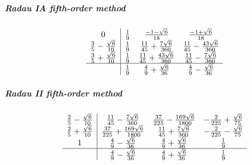 \subparagraph{Radau IA fifth-order method}
\begin{equation}
	\begin{array}{c|ccc}
		0   & \frac{1}{9} & \frac{-1 - \sqrt{6}}{18} & \frac{-1 + \sqrt{6}}{18} \\
		\frac{3}{5} - \frac{\sqrt{6}}{10}  & \frac{1}{9} & \frac{11}{45} + \frac{7\sqrt{6}}{360} & \frac{11}{45} - \frac{43\sqrt{6}}{360}\\
		\frac{3}{5} + \frac{\sqrt{6}}{10} & \frac{1}{9} & \frac{11}{45} + \frac{43\sqrt{6}}{360} & \frac{11}{45} - \frac{7\sqrt{6}}{360}  \\
		\hline
		& \frac{1}{9} & \frac{4}{9} + \frac{\sqrt{6}}{36} & \frac{4}{9} - \frac{\sqrt{6}}{36}  \\
	\end{array}
	\label{eq::radauia}
\end{equation}

\subparagraph{Radau II fifth-order method}
\begin{equation}
	\begin{array}{c|ccc}
		\frac{2}{5} - \frac{\sqrt{6}}{10}   & \frac{11}{45} - \frac{7\sqrt{6}}{360} & \frac{37}{225} - \frac{169\sqrt{6}}{1800} & -\frac{2}{225} + \frac{\sqrt{6}}{75} \\
		\frac{2}{5} + \frac{\sqrt{6}}{10}  & \frac{37}{225} + \frac{169\sqrt{6}}{1800} & \frac{11}{45} + \frac{7\sqrt{6}}{360} & -\frac{2}{225} - \frac{\sqrt{6}}{75}\\
		1                   & \frac{4}{9} - \frac{\sqrt{6}}{36} & \frac{4}{9} + \frac{\sqrt{6}}{36} & \frac{1}{9}  \\
		\hline
		& \frac{4}{9} - \frac{\sqrt{6}}{36} & \frac{4}{9} + \frac{\sqrt{6}}{36} & \frac{1}{9}  \\
	\end{array}
	\label{eq::radauiia}
\end{equation}

